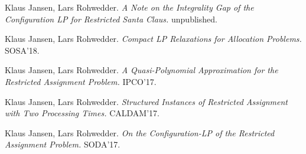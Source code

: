 \documentclass{article}
\begin{document}
  
     \noindent
     Klaus Jansen, Lars Rohwedder. {\it A Note on the Integrality Gap of the Configuration LP for Restricted Santa Claus.} unpublished. \medskip

  
     \noindent
     Klaus Jansen, Lars Rohwedder. {\it Compact LP Relaxations for Allocation Problems.} SOSA'18. \medskip

  
     \noindent
     Klaus Jansen, Lars Rohwedder. {\it A Quasi-Polynomial Approximation for the Restricted Assignment Problem.} IPCO'17. \medskip

  
     \noindent
     Klaus Jansen, Lars Rohwedder. {\it Structured Instances of Restricted Assignment with Two Processing Times.} CALDAM'17. \medskip

  
     \noindent
     Klaus Jansen, Lars Rohwedder. {\it On the Configuration-LP of the Restricted Assignment Problem.} SODA'17. \medskip

  
\end{document}
